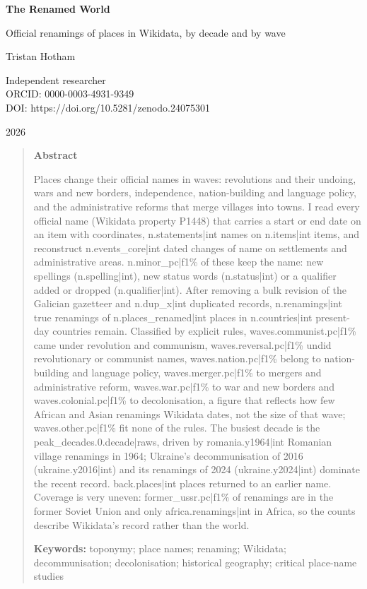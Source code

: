 \documentclass[11pt,a4paper]{article}
\begin{document}
\begin{center}
{\Large\bfseries The Renamed World\par}
\vspace{0.4em}
{\large Official renamings of places in Wikidata, by decade and by wave\par}
\vspace{1.2em}
{\large Tristan Hotham\par}
\vspace{0.3em}
{\small Independent researcher\\
ORCID: 0000-0003-4931-9349\\
DOI: https://doi.org/10.5281/zenodo.24075301\par}
\vspace{0.8em}
2026
\end{center}

\begin{quote}
\small
\begin{center}\textbf{Abstract}\end{center}
Places change their official names in waves: revolutions and their undoing, wars and new borders, independence, nation-building and language policy, and the administrative reforms that merge villages into towns. I read every official name (Wikidata property P1448) that carries a start or end date on an item with coordinates, {{n.statements|int}} names on {{n.items|int}} items, and reconstruct {{n.events_core|int}} dated changes of name on settlements and administrative areas. {{n.minor_pc|f1}}\% of these keep the name: new spellings ({{n.spelling|int}}), new status words ({{n.status|int}}) or a qualifier added or dropped ({{n.qualifier|int}}). After removing a bulk revision of the Galician gazetteer and {{n.dup_x|int}} duplicated records, {{n.renamings|int}} true renamings of {{n.places_renamed|int}} places in {{n.countries|int}} present-day countries remain. Classified by explicit rules, {{waves.communist.pc|f1}}\% came under revolution and communism, {{waves.reversal.pc|f1}}\% undid revolutionary or communist names, {{waves.nation.pc|f1}}\% belong to nation-building and language policy, {{waves.merger.pc|f1}}\% to mergers and administrative reform, {{waves.war.pc|f1}}\% to war and new borders and {{waves.colonial.pc|f1}}\% to decolonisation, a figure that reflects how few African and Asian renamings Wikidata dates, not the size of that wave; {{waves.other.pc|f1}}\% fit none of the rules. The busiest decade is the {{peak_decades.0.decade|raw}}s, driven by {{romania.y1964|int}} Romanian village renamings in 1964; Ukraine's decommunisation of 2016 ({{ukraine.y2016|int}}) and its renamings of 2024 ({{ukraine.y2024|int}}) dominate the recent record. {{back.places|int}} places returned to an earlier name. Coverage is very uneven: {{former_ussr.pc|f1}}\% of renamings are in the former Soviet Union and only {{africa.renamings|int}} in Africa, so the counts describe Wikidata's record rather than the world.

\textbf{Keywords:} toponymy; place names; renaming; Wikidata; decommunisation; decolonisation; historical geography; critical place-name studies
\end{quote}
\end{document}
